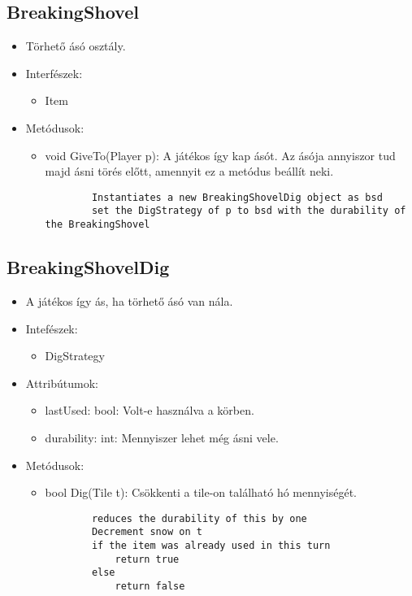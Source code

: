\subsection{BreakingShovel}
\begin{itemize}	
	\item Törhető ásó osztály.
	\item Interfészek:
	\begin{itemize}
		\item Item
	\end{itemize}
	\item Metódusok:
	\begin{itemize}
		\item void GiveTo(Player p): A játékos így kap ásót. Az ásója annyiszor tud majd ásni törés előtt, amennyit ez a metódus beállít neki.
		\begin{lstlisting}
		Instantiates a new BreakingShovelDig object as bsd
		set the DigStrategy of p to bsd with the durability of the BreakingShovel
		\end{lstlisting}
	\end{itemize}
\end{itemize}

\subsection{BreakingShovelDig}
\begin{itemize}
	\item A játékos így ás, ha törhető ásó van nála.
	\item Intefészek:
	\begin{itemize}
		\item DigStrategy
	\end{itemize}
	\item Attribútumok:
	\begin{itemize}
		\item lastUsed: bool: Volt-e használva a körben.
		\item durability: int: Mennyiszer lehet még ásni vele.
	\end{itemize}
	\item Metódusok:
	\begin{itemize}
		\item bool Dig(Tile t): Csökkenti a tile-on található hó mennyiségét.
		\begin{lstlisting}
		reduces the durability of this by one
		Decrement snow on t
		if the item was already used in this turn
			return true
		else
			return false
		\end{lstlisting}
	\end{itemize}
\end{itemize}

